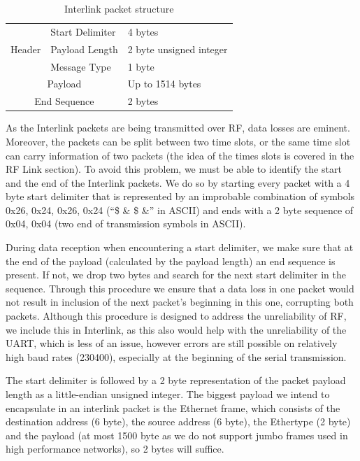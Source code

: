 \begin{table}
\centering
\caption{Interlink packet structure}
\label{interlink-pkt-struct}
\begin{tabular}{|p{1in}|p{1.5in}|p{2in}|} \hline 
\multirow{3}{*}{Header} & Start Delimiter & {4 bytes} \\ \cline{2-3}
 & Payload Length & 2 byte unsigned integer \\ \cline{2-3}
 & Message Type & 1 byte \\ \cline{2-3} \hline
 \multicolumn{2}{|c|}{Payload} & Up to 1514 bytes \\ \hline
 \multicolumn{2}{|c|}{End Sequence} & 2 bytes \\ \hline
\end{tabular}
\end{table}

As the Interlink packets are being transmitted over RF, data losses are eminent. Moreover, the packets can be split between two time slots, or the same time slot can carry information of two packets (the idea of the times slots is covered in the RF Link section). To avoid this problem, we must be able to identify the start and the end of the Interlink packets. We do so by starting every packet with a 4 byte start delimiter that is represented by an improbable combination of symbols {0x26, 0x24, 0x26, 0x24} (“\$ \& \$ \&” in ASCII) and ends with a 2 byte sequence of {0x04, 0x04} (two end of transmission symbols in ASCII). 

During data reception when encountering a start delimiter, we make sure that at the end of the payload (calculated by the payload length) an end sequence is present. If not, we drop two bytes and search for the next start delimiter in the sequence. Through this procedure we ensure that a data loss in one packet would not result in inclusion of the next packet’s beginning in this one, corrupting both packets. Although this procedure is designed to address the unreliability of RF, we include this in Interlink, as this also would help with the unreliability of the UART, which is less of an issue, however errors are still possible on relatively high baud rates (230400), especially at the beginning of the serial transmission.

The start delimiter is followed by a 2 byte representation of the packet payload length as a little-endian unsigned integer. The biggest payload we intend to encapsulate in an interlink packet is the Ethernet frame, which consists of the destination address (6 byte), the source address (6 byte), the Ethertype (2 byte) and the payload (at most 1500 byte as we do not support jumbo frames used in high performance networks), so 2 bytes will suffice.

